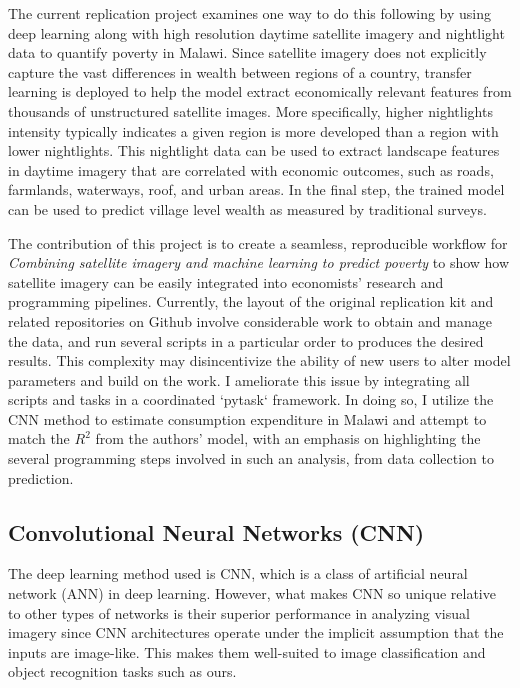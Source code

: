 \documentclass[11pt, a4paper, leqno]{article}
\begin{document}
The current replication project examines one way to do this following \citet{jean2016combining} by using deep learning along with high resolution daytime satellite imagery and nightlight data to quantify poverty in Malawi. Since satellite imagery does not explicitly capture the vast differences in wealth between regions of a country, transfer learning is deployed to help the model extract economically relevant features from thousands of unstructured satellite images. More specifically, higher nightlights intensity typically indicates a given region is more developed than a region with lower nightlights. This nightlight data can be used to extract landscape features in daytime imagery that are correlated with economic outcomes, such as roads, farmlands, waterways, roof, and urban areas. In the final step, the trained model can be used to predict village level wealth as measured by traditional surveys. 

The contribution of this project is to create a seamless, reproducible workflow for  \textit{Combining satellite imagery and machine learning to predict poverty} \citep{jean2016combining} to show how satellite imagery can be easily integrated into economists' research and programming pipelines. Currently, the layout of the original replication kit and related repositories on Github involve considerable work to obtain and manage the data, and run several scripts in a particular order to produces the desired results. This complexity may disincentivize the ability of new users to alter model parameters and build on the work. I ameliorate this issue by integrating all scripts and tasks in a coordinated `pytask` framework. In doing so, I utilize the CNN method to estimate consumption expenditure in Malawi and attempt to match the $R^2$ from the authors' model, with an emphasis on highlighting the several programming steps involved in such an analysis, from data collection to prediction. 

\subsection{Convolutional Neural Networks (CNN)}

The deep learning method used is CNN, which is a class of artificial neural network (ANN) in deep learning. However, what makes CNN so unique relative to other types of networks is their superior performance in analyzing visual imagery since CNN architectures operate under the implicit assumption that the inputs are image-like. This makes them well-suited to image classification and object recognition tasks such as ours.
\end{document}
